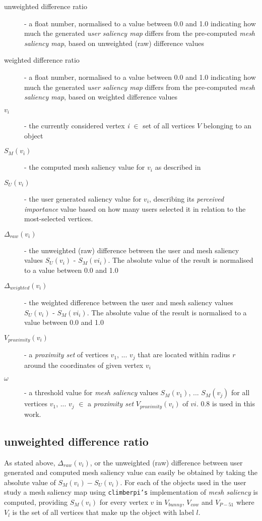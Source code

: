\begin{description}
	\item[unweighted difference ratio] - a float number, normalised to a value between 0.0 and 1.0 indicating how much the generated \textit{user saliency map} differs from the pre-computed \textit{mesh saliency map}, based on unweighted (raw) difference values
	\item[weighted difference ratio] - a float number, normalised to a value between 0.0 and 1.0 indicating how much the generated \textit{user saliency map} differs from the pre-computed \textit{mesh saliency map}, based on weighted difference values
	\item[$v_i$] - the currently considered vertex \textit{i} $\in$ set of all vertices $V$ belonging to an object
	\item[$S_{M}(v_i)$] - the computed mesh saliency value for $v_i$ as described in \cite{lee2005mesh}
	\item[$S_{U}(v_i)$] - the user generated saliency value for $v_i$, describing its \textit{perceived importance} value based on how many users selected it in relation to the most-selected vertices.
	\item[$\Delta_{raw}(v_i)$] - the unweighted (raw) difference between the user and mesh saliency values $S_{U}(v_i)$ - $S_{M}(vi_i)$. The absolute value of the result is normalised to a value between 0.0 and 1.0
	\item[$\Delta_{weighted}(v_i)$] - the weighted difference between the user and mesh saliency values $S_{U}(v_i)$ - $S_{M}(vi_i)$. The absolute value of the result is normalised to a value between 0.0 and 1.0
	\item[$V_{proximity}(v_i)$] - a \textit{proximity set} of vertices $v_1$, ... $v_j$ that are located within radius $r$ around the coordinates of given vertex $v_i$
	\item[$\omega$] - a threshold value for \textit{mesh saliency} values $S_{M}(v_1)$, ... $S_{M}(v_j)$ for all vertices $v_1$, ... $v_j$ $\in$ a \textit{proximity set} $V_{proximity}(v_i)$ of $vi$. $0.8$ is used in this work.
\end{description}

		\subsection{unweighted difference ratio}
		\label{sec:unweighted_difference_ratio}
As stated above, $\Delta_{raw}(v_i)$, or the unweighted (raw) difference between user generated and computed mesh saliency value can easily be obtained by taking the absolute value of $S_{M}(v_i) - S_{U}(v_i)$. For each of the objects used in the user study a mesh saliency map using \texttt{climberpi's} implementation of \textit{mesh saliency} \cite{clms} is computed, providing $S_{M}(v_i)$ for every vertex $v$ in $V_{bunny}$, $V_{cow}$ and $V_{P-51}$ where $V_{l}$ is the set of all vertices that make up the object with label $l$.

